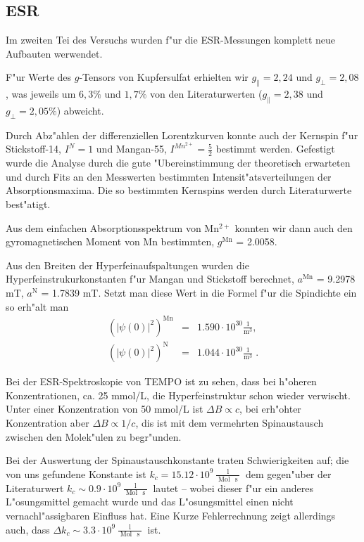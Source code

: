 \documentclass[a4paper,12pt]{article}
\begin{document}
\subsection{ESR}
\label{sec:zusammenfassung_esr}

Im zweiten Tei des Versuchs wurden f"ur die ESR-Messungen komplett
neue Aufbauten werwendet.

F"ur Werte des $g$-Tensors von Kupfersulfat erhielten wir 
$g_\parallel = 2,24$ und $g_\perp = 2,08$ , was jeweils um $6,3\%$
und $1,7\%$ von den Literaturwerten ($g_\parallel = 2,38$ und
$g_\perp = 2,05\%$) abweicht.

Durch Abz"ahlen der differenziellen Lorentzkurven konnte auch der
Kernspin f"ur Stickstoff-14, $I^{N} = 1$ und Mangan-55, $I^{Mn^{2+}} =
\frac 5 2$ bestimmt werden. Gefestigt wurde die Analyse durch die gute
"Ubereinstimmung der theoretisch erwarteten und durch Fits an den
Messwerten bestimmten Intensit"atsverteilungen der Absorptionsmaxima.
Die so bestimmten Kernspins werden durch Literaturwerte best"atigt.

Aus dem einfachen Absorptionsspektrum von Mn$^{2+}$ konnten wir dann auch
den gyromagnetischen Moment von Mn bestimmten, $g^\text{Mn}$ = 2.0058.

Aus den Breiten der Hyperfeinaufspaltungen wurden die
Hyperfeinstrukurkonstanten f"ur Mangan und Stickstoff berechnet,
$a^\text{Mn}$ = 9.2978 mT, $a^\text{N}$ = 1.7839 mT. Setzt man diese Wert in
die Formel f"ur die Spindichte ein so erh"alt man
\begin{eqnarray*}
  \left(  |\psi(0)|^2  \right)^\text{Mn} &=&  1.590 \cdot 10^{30}
  \frac{1}{\operatorname{m}^3}, \\ 
  \left(  |\psi(0)|^2  \right)^\text{N} &=& 1.044 \cdot 10^{30}
  \frac{1}{\operatorname{m}^3} \;.
\end{eqnarray*}

Bei der ESR-Spektroskopie von TEMPO ist zu sehen, dass bei h"oheren
Konzentrationen, ca. 25 mmol/L, die Hyperfeinstruktur schon wieder
verwischt. Unter einer Konzentration von 50 mmol/L ist $\Delta B
\propto c$, bei erh"ohter Konzentration aber $\Delta B \propto 1/c$,
dis ist mit dem vermehrten Spinaustausch zwischen den Molek"ulen zu
begr"unden.

Bei der Auswertung der Spinaustauschkonstante traten Schwierigkeiten
auf; die von uns gefundene Konstante ist $k_c = 15.12 \cdot 10^9
\frac{\operatorname{l} }{\operatorname{Mol} \, \operatorname{s}}$ dem
gegen"uber der Literaturwert $k_c \sim 0.9 \cdot 10^9
\frac{\operatorname{l} }{\operatorname{Mol} \, \operatorname{s}}$
lautet -- wobei dieser f"ur ein anderes L"osungsmittel gemacht wurde
und das L"osungsmittel einen nicht vernachl"assigbaren Einfluss
hat.  Eine Kurze Fehlerrechnung zeigt allerdings auch, dass $\Delta
k_c \sim 3.3 \cdot 10^9\frac{ \operatorname{l} }{\operatorname{Mol} \,
  \operatorname{s}}$ ist.
\end{document}
